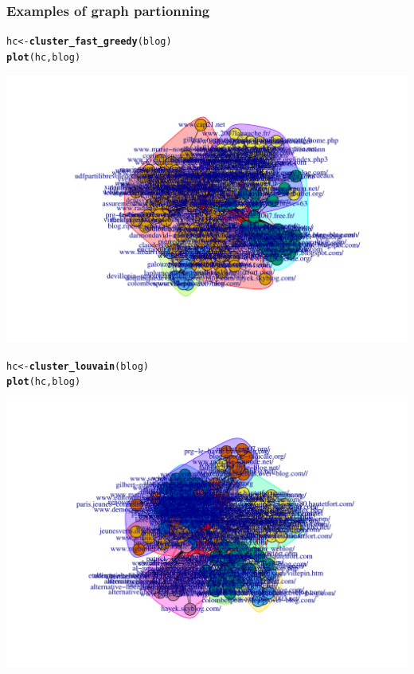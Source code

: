 \documentclass{beamer}\usepackage[]{graphicx}\usepackage[]{color}
\makeatletter
\newcommand{\hlstd}[1]{\textcolor[rgb]{0.345,0.345,0.345}{#1}}%
\newcommand{\hlkwb}[1]{\textcolor[rgb]{0.69,0.353,0.396}{#1}}%
\newcommand{\hlkwd}[1]{\textcolor[rgb]{0.737,0.353,0.396}{\textbf{#1}}}%
\newenvironment{kframe}{%
 \def\at@end@of@kframe{}%
 \ifinner\ifhmode%
  \def\at@end@of@kframe{\end{minipage}}%
  \begin{minipage}{\columnwidth}%
 \fi\fi%
 \def\FrameCommand##1{\hskip\@totalleftmargin \hskip-\fboxsep
 \colorbox{shadecolor}{##1}\hskip-\fboxsep
     \hskip-\linewidth \hskip-\@totalleftmargin \hskip\columnwidth}%
 \MakeFramed {\advance\hsize-\width
   \@totalleftmargin\z@ \linewidth\hsize
   \@setminipage}}%
 {\par\unskip\endMakeFramed%
 \at@end@of@kframe}
\newenvironment{knitrout}{}{} %
\makeatother
\begin{document}
\begin{frame}
  \frametitle{Examples of graph partionning}

\begin{knitrout}\scriptsize
{}\color{fgcolor}\begin{kframe}
\begin{alltt}
\hlstd{hc} \hlkwb{<-} \hlkwd{cluster_fast_greedy}\hlstd{(blog)}
\hlkwd{plot}\hlstd{(hc, blog)}
\end{alltt}
\end{kframe}
\includegraphics[width=.8\textwidth]{figures/unnamed-chunk-2-1} 
\end{knitrout}

\begin{knitrout}\scriptsize
{}\color{fgcolor}\begin{kframe}
\begin{alltt}
\hlstd{hc} \hlkwb{<-} \hlkwd{cluster_louvain}\hlstd{(blog)}
\hlkwd{plot}\hlstd{(hc, blog)}
\end{alltt}
\end{kframe}
\includegraphics[width=.8\textwidth]{figures/unnamed-chunk-3-1} 
\end{knitrout}


\end{frame}
\end{document}
